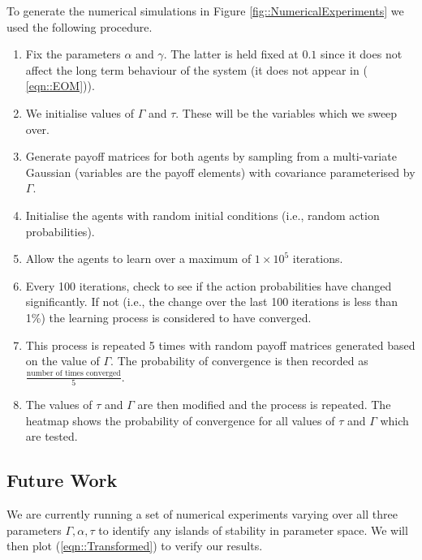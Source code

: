 \documentclass[.../main.tex]{subfiles}
\begin{document}
   To generate the numerical simulations in Figure \ref{fig::NumericalExperiments} we used the
   following procedure.

\begin{enumerate}
    \item Fix the parameters $\alpha$ and $\gamma$. The latter is held fixed at $0.1$ since
    it does not affect the long term behaviour of the system (it does not appear in (
    \ref{eqn::EOM})).
    \item We initialise values of $\Gamma$ and $\tau$. These will be the variables which we sweep
    over.
    \item Generate payoff matrices for both agents by sampling from a multi-variate Gaussian 
    (variables are the payoff elements) with covariance parameterised by $\Gamma$.
    \item Initialise the agents with random initial conditions
      (i.e., random action probabilities).
    \item Allow the agents to learn over a maximum of $1 \times 10^5$ iterations.
    \item Every 100 iterations, check to see if the action
      probabilities have changed significantly.  If not (i.e., the
      change over the last 100 iterations is less than 1\%) the
      learning process is considered to have converged.
    
    \item This process is repeated 5 times with random payoff matrices generated based on the value
    of $\Gamma$. The probability of convergence is then recorded as $\frac{\text{number of times
    converged}}{5}$.

  \item The values of $\tau$ and $\Gamma$ are then modified and the process is repeated. The
    heatmap shows the probability of convergence for all values of $\tau$ and $\Gamma$ which are
    tested.
\end{enumerate}


    \subsection*{Future Work} \label{sec::Future Work}

    We are currently running a set of numerical experiments varying over all three parameters
    $\Gamma, \alpha, \tau$ to identify any islands of stability in parameter space. We will then
    plot (\ref{eqn::Transformed}) to verify our results.
\end{document}
